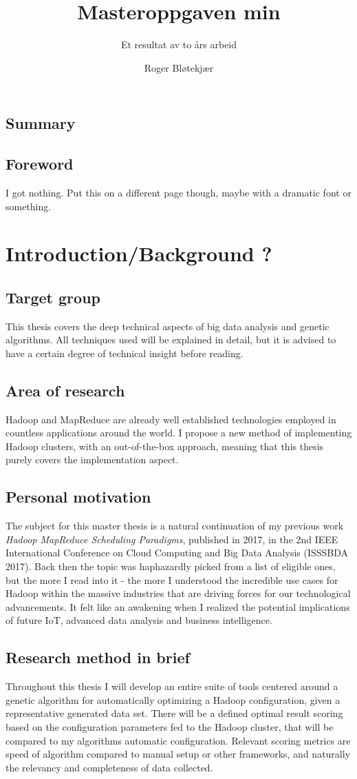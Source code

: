 \documentclass[a4paper,english]{report}
\title{Masteroppgaven min}
\subtitle{Et resultat av to års arbeid}
\author{Roger Bløtekjær}
\begin{document}
	\duoforside[dept={Institutt for informatikk},
	program={Informatikk: språkteknologi},
	short]
	\section{Summary}
	\section{Foreword}
	I got nothing. Put this on a different page though, maybe with a dramatic font or something.
	\tableofcontents
	\chapter{Introduction/Background ?}
		\section{Target group}
		This thesis covers the deep technical aspects of big data analysis and genetic algorithms. All techniques used will be explained in detail, but it is advised to have a certain degree of technical insight before reading.
		\section{Area of research}
		Hadoop and MapReduce are already well established technologies employed in countless applications around the world. I propose a new method of implementing Hadoop clusters, with an out-of-the-box approach, meaning that this thesis purely covers the implementation aspect.
		\section{Personal motivation}
		The subject for this master thesis is a natural continuation of my previous work \emph{Hadoop MapReduce Scheduling Paradigms}, published in 2017, in the 2nd IEEE International Conference on Cloud Computing and Big Data Analysis (ISSSBDA 2017). Back then the topic was haphazardly picked from a list of eligible ones, but the more I read into it - the more I understood the incredible use cases for Hadoop within the massive industries that are driving forces for our technological advancements. It felt like an awakening when I realized the potential implications of future IoT, advanced data analysis and business intelligence.
		\section{Research method in brief}
		Throughout this thesis I will develop an entire suite of tools centered around a genetic algorithm for automatically optimizing a Hadoop configuration, given a representative generated data set. There will be a defined optimal result scoring based on the configuration parameters fed to the Hadoop cluster, that will be compared to my algorithms automatic configuration. Relevant scoring metrics are speed of algorithm compared to manual setup or other frameworks, and naturally the relevancy and completeness of data collected.
\end{document}
